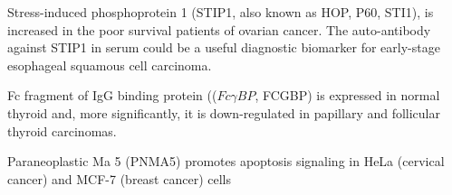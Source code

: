 \documentclass[preprint,12pt]{elsarticle}
\newenvironment{MyColorPar}[1]{%
    \leavevmode\color{#1}\ignorespaces%
}{%
}%
\begin{document}
\begin{MyColorPar}{blue}
Stress-induced phosphoprotein 1 (STIP1, also known as HOP, P60, STI1), is increased
in the poor survival patients of ovarian cancer\cite{Chao2013}\cite{Cho2014}. 
The auto-antibody against STIP1 in serum could be a useful diagnostic biomarker for early-stage esophageal squamous cell carcinoma\cite{Xu2017}.







Fc fragment of IgG binding protein (($Fc\gamma BP$, FCGBP) is expressed in normal thyroid and, more significantly, it is down-regulated in papillary and follicular thyroid carcinomas.\cite{ODonovan2002}\cite{Griffith2006}


Paraneoplastic Ma 5 (PNMA5) promotes apoptosis signaling in HeLa (cervical cancer) and MCF-7 (breast cancer) cells\cite{Lee2016}



\end{MyColorPar}
\end{document}
